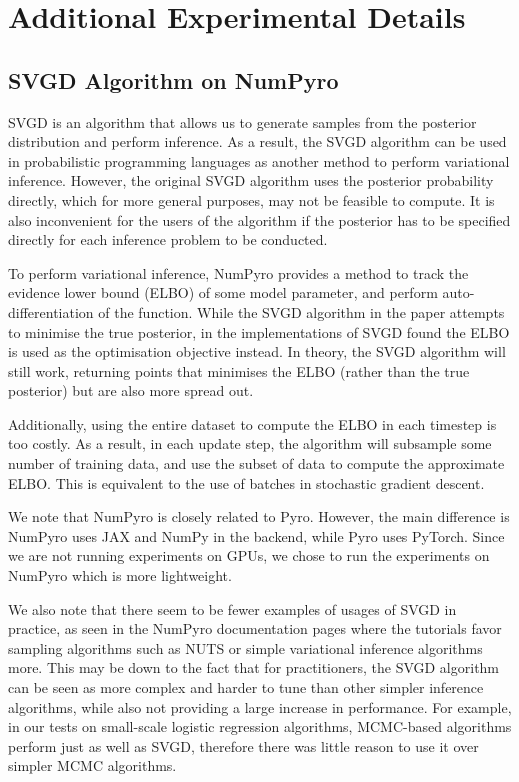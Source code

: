 \section{Additional Experimental Details}

\subsection{SVGD Algorithm on NumPyro}
\label{ssect:svgd-npy}

SVGD is an algorithm that allows us to generate samples from the posterior distribution and perform inference. As a result, the SVGD algorithm can be used in probabilistic programming languages as another method to perform variational inference. However, the original SVGD algorithm uses the posterior probability directly, which for more general purposes, may not be feasible to compute. It is also inconvenient for the users of the algorithm if the posterior has to be specified directly for each inference problem to be conducted.

To perform variational inference, NumPyro provides a method to track the evidence lower bound (ELBO) of some model parameter, and perform auto-differentiation of the function. While the SVGD algorithm in the paper attempts to minimise the true posterior, in the implementations of SVGD found the ELBO is used as the optimisation objective instead. In theory, the SVGD algorithm will still work, returning points that minimises the ELBO (rather than the true posterior) but are also more spread out. 

Additionally, using the entire dataset to compute the ELBO in each timestep is too costly. As a result, in each update step, the algorithm will subsample some number of training data, and use the subset of data to compute the approximate ELBO. This is equivalent to the use of batches in stochastic gradient descent.

We note that NumPyro is closely related to Pyro. However, the main difference is NumPyro uses JAX and NumPy in the backend, while Pyro uses PyTorch. Since we are not running experiments on GPUs, we chose to run the experiments on NumPyro which is more lightweight.

We also note that there seem to be fewer examples of usages of SVGD in practice, as seen in the NumPyro documentation pages where the tutorials favor sampling algorithms such as NUTS or simple variational inference algorithms more. This may be down to the fact that for practitioners, the SVGD algorithm can be seen as more complex and harder to tune than other simpler inference algorithms, while also not providing a large increase in performance. For example, in our tests on small-scale logistic regression algorithms, MCMC-based algorithms perform just as well as SVGD, therefore there was little reason to use it over simpler MCMC algorithms. 

